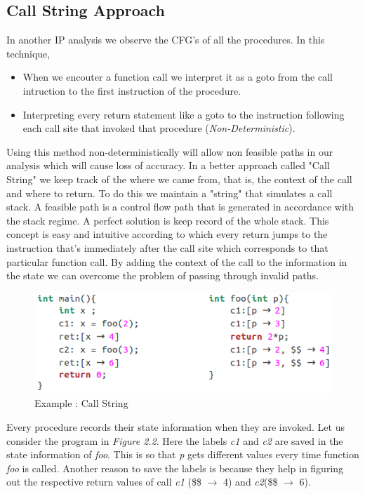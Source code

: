 \documentclass[12pt,oneside]{book}
\begin{document}
\subsection {Call String Approach}
In another IP analysis we observe the CFG's of all the procedures. In this technique,
\begin{itemize}
\item When we encouter a function call we interpret it as a goto from the call intruction to the first instruction of the procedure.
\item Interpreting every return statement like a goto to the instruction following each call site that invoked that procedure (\textit{Non-Deterministic}).
\end{itemize}
Using this method non-deterministically will allow non feasible paths in our analysis which will cause loss of accuracy. In a better approach called "Call String" we keep track of the where we came from, that is, the context of the call and where to return. To do this we maintain a "string" that simulates a call stack. A feasible path is a control flow path that is generated in accordance with the stack regime. A perfect solution is keep record of the whole stack. This concept is easy and intuitive according to which every return jumps to the instruction that's immediately after the call site which corresponds to that particular function call. By adding the context of the call to the information in the state we can overcome the problem of passing through invalid paths.\\

\begin{figure}[htbp]
\centering
\includegraphics[scale=0.6]{callString.png}
\caption{Example : Call String}
\end{figure}  
 
Every procedure records their state information when they are invoked. Let us consider the program in \textit{Figure 2.2}. Here the labels \textit{c1} and \textit{c2} are saved in the state information of \textit{foo}. This is so that \textit{p} gets different values every time function \textit{foo} is called. Another reason to save the labels is because they help in figuring out the respective return values of call \textit{c1} (\$\$ $\rightarrow$ 4) and \textit{c2}(\$\$ $\rightarrow$ 6).
\end{document}
